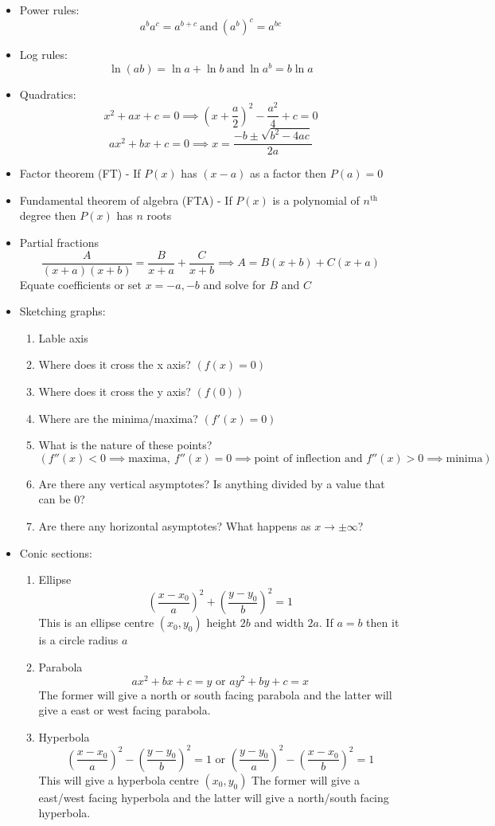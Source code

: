 \documentclass{article}
\begin{document}
\begin{itemize}
\item Power rules:
\[a^ba^c=a^{b+c}~\text{and}~(a^b)^c=a^{bc}\]
\item Log rules:
\[\ln(ab)=\ln a+\ln b~\text{and}~\ln a^b=b\ln a\]
\item Quadratics:
\[x^2+ax+c=0\implies\left(x+\frac{a}{2}\right)^2-\frac{a^2}{4}+c=0\]
\[ax^2+bx+c=0\implies x=\frac{-b\pm\sqrt{b^2-4ac}}{2a}\]
\item Factor theorem (FT) - If \(P(x)\) has \((x-a)\) as a factor then \(P(a)=0\)
\item Fundamental theorem of algebra (FTA) - If \(P(x)\) is a polynomial of \(n^{\text{th}}\) degree then \(P(x)\) has \(n\) roots
\item Partial fractions
\[\frac{A}{(x+a)(x+b)}=\frac{B}{x+a}+\frac{C}{x+b}\implies A=B(x+b)+C(x+a)\]
Equate coefficients or set \(x=-a,-b\) and solve for \(B\) and \(C\)
\item Sketching graphs:
\begin{enumerate}
\item Lable axis
\item Where does it cross the x axis? \((f(x)=0)\)
\item Where does it cross the y axis? \((f(0))\)
\item Where are the minima/maxima? \((f'(x)=0)\)
\item What is the nature of these points? \((f''(x)<0\implies \text{maxima},~f''(x)=0\implies \text{point of inflection}\text{ and }f''(x)>0\implies \text{minima})\)
\item Are there any vertical asymptotes? Is anything divided by a value that can be 0?
\item Are there any horizontal asymptotes? What happens as \(x\to\pm\infty\)?
\end{enumerate}
\item Conic sections:
\begin{enumerate}
\item Ellipse
\[\left(\frac{x-x_0}{a}\right)^2+\left(\frac{y-y_0}{b}\right)^2=1\]
This is an ellipse centre \((x_0,y_0)\) height \(2b\) and width \(2a\). If \(a=b\) then it is a circle radius \(a\)
\item Parabola
\[ax^2+bx+c=y \text{ or } ay^2+by+c=x\]
The former will give a north or south facing parabola and the latter will give a east or west facing parabola.
\item Hyperbola
\[\left(\frac{x-x_0}{a}\right)^2-\left(\frac{y-y_0}{b}\right)^2=1 \text{ or } \left(\frac{y-y_0}{a}\right)^2-\left(\frac{x-x_0}{b}\right)^2=1\]
This will give a hyperbola centre \((x_0,y_0)\) The former will give a east/west facing hyperbola and the latter will give a north/south facing hyperbola.
\end{enumerate}
\end{itemize}
\end{document}
